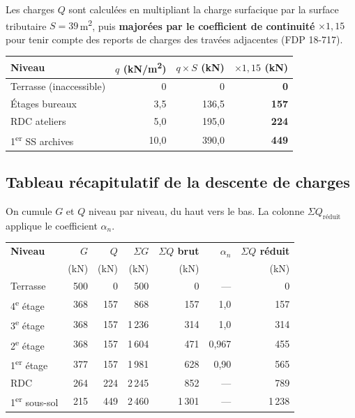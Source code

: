 Les charges $Q$ sont calculées en multipliant la charge surfacique par la surface tributaire $S = 39$\,m\textsuperscript{2}, puis \textbf{majorées par le coefficient de continuité} $\times 1{,}15$ pour tenir compte des reports de charges des travées adjacentes (FDP 18-717).

\begin{center}
\begin{tabular}{lrrr}
\toprule
Niveau & $q$ (kN/m\textsuperscript{2}) & $q \times S$ (kN) & $\times 1{,}15$ (kN) \\
\midrule
Terrasse (inaccessible)            & 0    & 0     & \textbf{0}   \\
Étages bureaux                     & 3,5  & 136,5 & \textbf{157} \\
RDC ateliers                       & 5,0  & 195,0 & \textbf{224} \\
1\textsuperscript{er} SS archives  & 10,0 & 390,0 & \textbf{449} \\
\bottomrule
\end{tabular}
\end{center}

\subsection{Tableau récapitulatif de la descente de charges}

On cumule $G$ et $Q$ niveau par niveau, du haut vers le bas. La colonne $\Sigma Q_\text{réduit}$ applique le coefficient $\alpha_n$.

\vspace{4pt}
\begin{center}
\renewcommand{\arraystretch}{1.4}
\begin{tabular}{lrrrrrr}
\toprule
\textbf{Niveau} & \textbf{$G$} & \textbf{$Q$} & \textbf{$\Sigma G$} & \textbf{$\Sigma Q$ brut} & \textbf{$\alpha_n$} & \textbf{$\Sigma Q$ réduit} \\
                & (kN)         & (kN)         & (kN)                & (kN)                     &                     & (kN) \\
\midrule
Terrasse                            & 500 & 0   & 500    & 0      & ---   & 0      \\
4\textsuperscript{e} étage          & 368 & 157 & 868    & 157    & 1,0   & 157    \\
3\textsuperscript{e} étage          & 368 & 157 & 1\,236 & 314    & 1,0   & 314    \\
2\textsuperscript{e} étage          & 368 & 157 & 1\,604 & 471    & 0,967 & 455    \\
1\textsuperscript{er} étage         & 377 & 157 & 1\,981 & 628    & 0,90  & 565    \\
RDC                                 & 264 & 224 & 2\,245 & 852    & ---   & 789    \\
1\textsuperscript{er} sous-sol      & 215 & 449 & 2\,460 & 1\,301 & ---   & 1\,238 \\
\bottomrule
\end{tabular}
\end{center}
\vspace{4pt}

